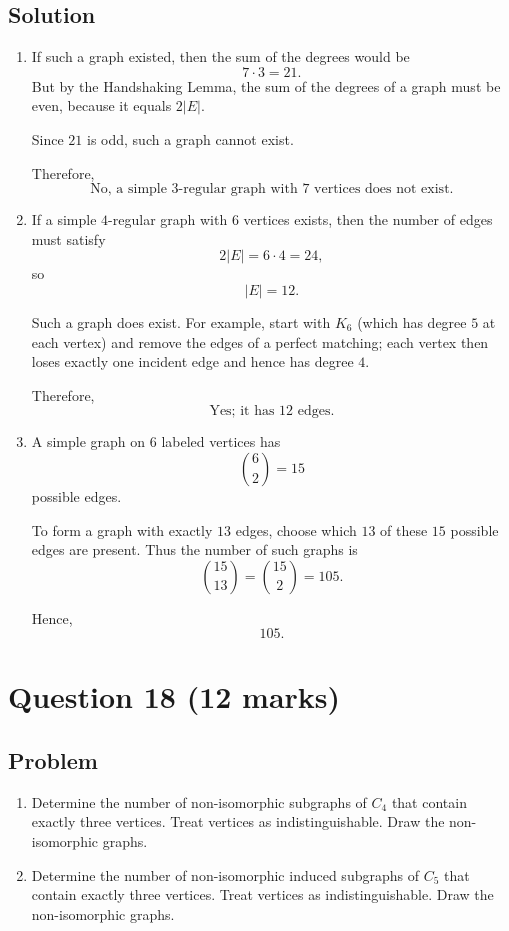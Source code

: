 \documentclass[12pt]{article}
\begin{document}
\subsection{Solution}

\begin{enumerate}[label=(\alph*)]
    \item If such a graph existed, then the sum of the degrees would be
    \[
    7\cdot 3=21.
    \]
    But by the Handshaking Lemma, the sum of the degrees of a graph must be even, because it equals $2|E|$.

    Since $21$ is odd, such a graph cannot exist.

    Therefore,
    \[
    \boxed{\text{No, a simple }3\text{-regular graph with }7\text{ vertices does not exist.}}
    \]

    \item If a simple $4$-regular graph with $6$ vertices exists, then the number of edges must satisfy
    \[
    2|E|=6\cdot 4=24,
    \]
    so
    \[
    |E|=12.
    \]

    Such a graph does exist. For example, start with $K_6$ (which has degree $5$ at each vertex) and remove the edges of a perfect matching; each vertex then loses exactly one incident edge and hence has degree $4$.

    Therefore,
    \[
    \boxed{\text{Yes; it has }12\text{ edges.}}
    \]

    \item A simple graph on $6$ labeled vertices has
    \[
    \binom{6}{2}=15
    \]
    possible edges.

    To form a graph with exactly $13$ edges, choose which $13$ of these $15$ possible edges are present. Thus the number of such graphs is
    \[
    \binom{15}{13}=\binom{15}{2}=105.
    \]

    Hence,
    \[
    \boxed{105}.
    \]
\end{enumerate}

\newpage
\section{Question 18 \hfill (12 marks)}
\subsection{Problem}

\begin{enumerate}[label=(\alph*)]
    \item Determine the number of non-isomorphic subgraphs of $C_4$ that contain exactly three vertices. Treat vertices as indistinguishable. Draw the non-isomorphic graphs.
    \item Determine the number of non-isomorphic induced subgraphs of $C_5$ that contain exactly three vertices. Treat vertices as indistinguishable. Draw the non-isomorphic graphs.
\end{enumerate}
\end{document}
